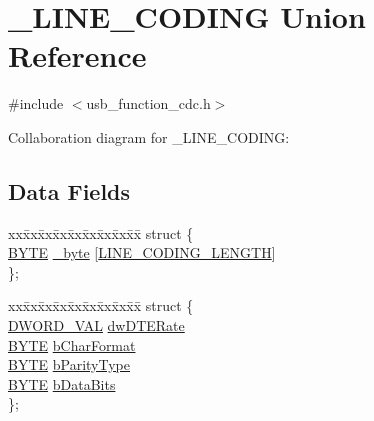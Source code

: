 \hypertarget{union___l_i_n_e___c_o_d_i_n_g}{}\section{\+\_\+\+L\+I\+N\+E\+\_\+\+C\+O\+D\+I\+N\+G Union Reference}
\label{union___l_i_n_e___c_o_d_i_n_g}


{\ttfamily \#include $<$usb\+\_\+function\+\_\+cdc.\+h$>$}



Collaboration diagram for \+\_\+\+L\+I\+N\+E\+\_\+\+C\+O\+D\+I\+N\+G\+:
\subsection*{Data Fields}
\begin{DoxyCompactItemize}
\item 
\begin{tabbing}
xx\=xx\=xx\=xx\=xx\=xx\=xx\=xx\=xx\=\kill
struct \{\\
\>\hyperlink{_generic_type_defs_8h_a4ae1dab0fb4b072a66584546209e7d58}{BYTE} \hyperlink{union___l_i_n_e___c_o_d_i_n_g_a3a0325c4645391fe20711434f6a6b223}{\_byte} \mbox{[}\hyperlink{usb__function__cdc_8h_ada94d5352bdcf99316d943b89ffa44d0}{LINE\_CODING\_LENGTH}\mbox{]}\\
\}; \\

\end{tabbing}\item 
\begin{tabbing}
xx\=xx\=xx\=xx\=xx\=xx\=xx\=xx\=xx\=\kill
struct \{\\
\>\hyperlink{union_d_w_o_r_d___v_a_l}{DWORD\_VAL} \hyperlink{union___l_i_n_e___c_o_d_i_n_g_a3f19594f07e3ee40f13461244d422caa}{dwDTERate}\\
\>\hyperlink{_generic_type_defs_8h_a4ae1dab0fb4b072a66584546209e7d58}{BYTE} \hyperlink{union___l_i_n_e___c_o_d_i_n_g_a946f73bf80c1a1df593f506d5381c22f}{bCharFormat}\\
\>\hyperlink{_generic_type_defs_8h_a4ae1dab0fb4b072a66584546209e7d58}{BYTE} \hyperlink{union___l_i_n_e___c_o_d_i_n_g_a264c2ee2e2f600d79638ef4c50dd8954}{bParityType}\\
\>\hyperlink{_generic_type_defs_8h_a4ae1dab0fb4b072a66584546209e7d58}{BYTE} \hyperlink{union___l_i_n_e___c_o_d_i_n_g_a302d162c7ae97d941879129a8be0ad95}{bDataBits}\\
\}; \\

\end{tabbing}\end{DoxyCompactItemize}


